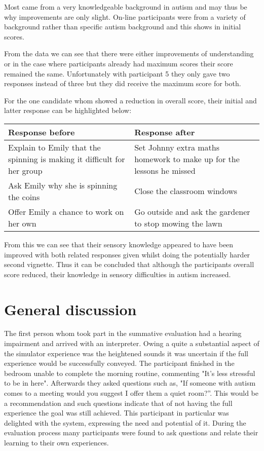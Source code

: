 Most came from a very knowledgeable background in autism and may thus be why improvements are only slight. On-line participants were from a variety of background rather than specific autism background and this shows in initial scores. 

From the data we can see that there were either improvements of understanding or in the case where participants already had maximum scores their score remained the same. Unfortunately with participant 5 they only gave two responses instead of three but they did receive the maximum score for both.

For the one candidate whom showed a reduction in overall score, their initial and latter response can be highlighted below:

\begin{table}[H]
    \begin{tabular}{| p{6cm} | p{6cm} |}
    \hline
    \textbf{Response before} & \textbf{Response after}  \\                                                                                                                                                                                    
	\hline
	\hline
	Explain to Emily that the spinning is making it difficult for her group & Set Johnny extra maths homework to make up for the lessons he missed \\ \hline
	Ask Emily why she is spinning the coins & Close the classroom windows \\ \hline
	Offer Emily a chance to work on her own & Go outside and ask the gardener to stop mowing the lawn \\ 
    \hline
    \end{tabular}
\end{table}

From this we can see that their sensory knowledge appeared to have been improved with both related responses given whilst doing the potentially harder second vignette. Thus it can be concluded that although the participants overall score reduced, their knowledge in sensory difficulties in autism increased. 


\section{General discussion}


The first person whom took part in the summative evaluation had a hearing impairment and arrived with an interpreter. Owing a quite a substantial aspect of the simulator experience was the heightened sounds it was uncertain if the full experience would be successfully conveyed. The participant finished in the bedroom unable to complete the morning routine, commenting "It's less stressful to be in here". Afterwards they asked questions such as, "If someone with autism comes to a meeting would you suggest I offer them a quiet room?”. This would be a recommendation and such questions indicate that of not having the full experience the goal was still achieved. This participant in particular was delighted with the system, expressing the need and potential of it. During the evaluation process many participants were found to ask questions and relate their learning to their own experiences.

